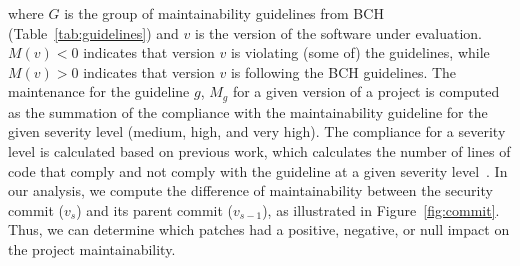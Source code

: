\documentclass[smallextended]{svjour3}       %
\begin{document}
\noindent
where $G$ is the group of maintainability guidelines from BCH
(Table~\ref{tab:guidelines}) and $v$ is the version of the software 
under evaluation. $M(v) < 0$ indicates that version $v$ is violating 
(some of) the guidelines, while $M(v) > 0$ indicates that version 
$v$ is following the BCH guidelines. The maintenance for the 
guideline $g$, $M_g$ for a given version of a project is computed as 
the summation of the compliance with the maintainability guideline 
for the given severity level (medium, high, and very high).
The compliance for a severity level is calculated based on previous 
work, which calculates the number of lines of code that comply and 
not comply with the guideline at a given severity 
level~\cite{8919169}. In our analysis, we compute the difference of 
maintainability between the security commit ($v_{s}$) and its parent 
commit ($v_{s-1}$), as illustrated in Figure~\ref{fig:commit}. Thus, 
we can determine which patches had a positive, negative, or null 
impact on the project maintainability. 

%
%
%
%
\end{document}
